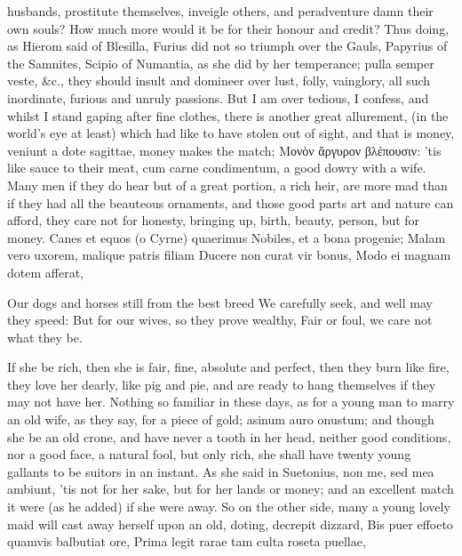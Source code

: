 {husbands, prostitute themselves, inveigle others, and peradventure damn
their own souls? How much more would it be for their honour and credit?
Thus doing, as Hierom said of Blesilla, Furius did not so triumph
over the Gauls, Papyrius of the Samnites, Scipio of Numantia, as she
did by her temperance; pulla semper veste, \&c., they should insult and
domineer over lust, folly, vainglory, all such inordinate, furious and
unruly passions.
But I am over tedious, I confess, and whilst I stand gaping after fine
clothes, there is another great allurement, (in the world's eye at
least) which had like to have stolen out of sight, and that is money,
veniunt a dote sagittae, money makes the match; Μονὸν ἄργυρον
βλέπουσιν: 'tis like sauce to their meat, cum carne condimentum, a good
dowry with a wife. Many men if they do hear but of a great portion, a
rich heir, are more mad than if they had all the beauteous ornaments,
and those good parts art and nature can afford, they care not for
honesty, bringing up, birth, beauty, person, but for money.
Canes et equos (o Cyrne) quaerimus
Nobiles, et a bona progenie;
Malam vero uxorem, malique patris filiam
Ducere non curat vir bonus,
Modo ei magnam dotem afferat,

Our dogs and horses still from the best breed
We carefully seek, and well may they speed:
But for our wives, so they prove wealthy,
Fair or foul, we care not what they be.

If she be rich, then she is fair, fine, absolute and perfect, then they
burn like fire, they love her dearly, like pig and pie, and are ready
to hang themselves if they may not have her. Nothing so familiar in
these days, as for a young man to marry an old wife, as they say, for a
piece of gold; asinum auro onustum; and though she be an old crone, and
have never a tooth in her head, neither good conditions, nor a good
face, a natural fool, but only rich, she shall have twenty young
gallants to be suitors in an instant. As she said in Suetonius, non me,
sed mea ambiunt, 'tis not for her sake, but for her lands or money; and
an excellent match it were (as he added) if she were away. So on the
other side, many a young lovely maid will cast away herself upon an
old, doting, decrepit dizzard,
Bis puer effoeto quamvis balbutiat ore,
Prima legit rarae tam culta roseta puellae,

}
